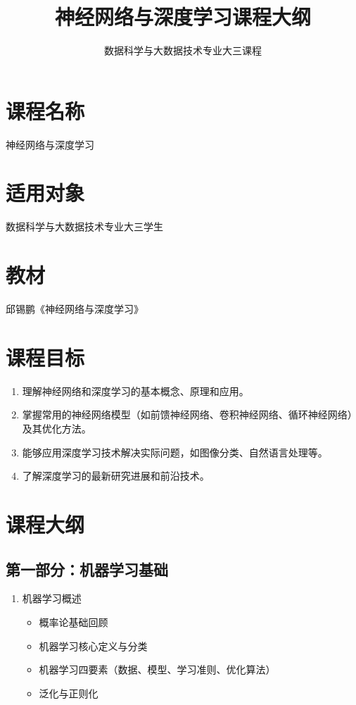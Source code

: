 \documentclass{../nndlcourse}
\begin{document}
\title{神经网络与深度学习课程大纲}
\author{数据科学与大数据技术专业大三课程}
\date{ }

\maketitle


\section*{课程名称}

神经网络与深度学习

\section*{适用对象}

数据科学与大数据技术专业大三学生

\section*{教材}

邱锡鹏《神经网络与深度学习》

\section*{课程目标}

\begin{enumerate}
    \item 理解神经网络和深度学习的基本概念、原理和应用。
    \item 掌握常用的神经网络模型（如前馈神经网络、卷积神经网络、循环神经网络）及其优化方法。
    \item 能够应用深度学习技术解决实际问题，如图像分类、自然语言处理等。
    \item 了解深度学习的最新研究进展和前沿技术。
\end{enumerate}

\section*{课程大纲}

\subsection*{第一部分：机器学习基础}

\begin{enumerate}
    \item 机器学习概述
    \begin{itemize}
        \item 概率论基础回顾
        \item 机器学习核心定义与分类
        \item 机器学习四要素（数据、模型、学习准则、优化算法）
        \item 泛化与正则化
    \end{itemize}
\end{enumerate}
\end{document}
